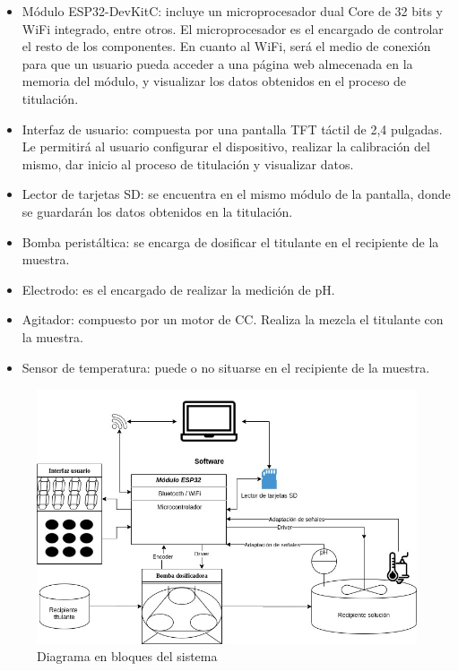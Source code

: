 \documentclass[11pt]{charter}
\begin{document}
\begin{itemize}
\item Módulo ESP32-DevKitC: incluye un microprocesador dual Core de 32 bits y WiFi integrado, entre otros. El microprocesador es el encargado de controlar el resto de los componentes. En cuanto al WiFi, será el medio de conexión para que un usuario pueda acceder a una página web almecenada en la memoria del módulo, y visualizar los datos obtenidos en el proceso de titulación.
\item Interfaz de usuario: compuesta por una pantalla TFT táctil de 2,4 pulgadas. Le permitirá al usuario configurar el dispositivo, realizar la calibración del mismo, dar inicio al proceso de titulación y visualizar datos.
\item Lector de tarjetas SD: se encuentra en el mismo módulo de la pantalla, donde se guardarán los datos obtenidos en la titulación.
\item Bomba peristáltica: se encarga de dosificar el titulante en el recipiente de la muestra.
\item Electrodo: es el encargado de realizar la medición de pH.
\item Agitador: compuesto por un motor de CC. Realiza la mezcla el titulante con la muestra.
\item Sensor de temperatura: puede o no situarse en el recipiente de la muestra.
\end{itemize}



\begin{figure}[htpb]
\centering 
\includegraphics[width=1\textwidth]{./Figuras/diagBloques.jpg}
\caption{Diagrama en bloques del sistema}
\label{fig:diagBloques}
\end{figure}
\end{document}
